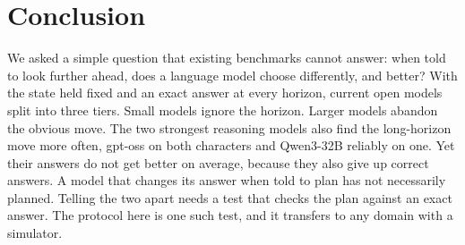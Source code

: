 \section{Conclusion}

We asked a simple question that existing benchmarks cannot answer: when told to look further ahead, does a language model choose differently, and better? With the state held fixed and an exact answer at every horizon, current open models split into three tiers. Small models ignore the horizon. Larger models abandon the obvious move. The two strongest reasoning models also find the long-horizon move more often, gpt-oss on both characters and Qwen3-32B reliably on one. Yet their answers do not get better on average, because they also give up correct answers. A model that changes its answer when told to plan has not necessarily planned. Telling the two apart needs a test that checks the plan against an exact answer. The protocol here is one such test, and it transfers to any domain with a simulator.
